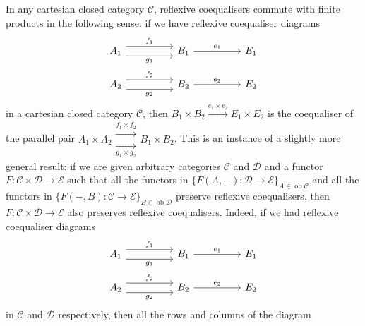 \documentclass[a4paper,11pt]{article}
\theoremstyle{break_italics}
\theoremstyle{break_upright}
\theoremstyle{remark}
\newcommand{\ob}{\operatorname{ob}}
\newcommand{\C}{\mathcal{C}}
\newcommand{\D}{\mathcal{D}}
\begin{document}
In any cartesian closed category $\C$, reflexive coequalisers commute with finite products in the following sense: if we have reflexive coequaliser diagrams
\[
\begin{tikzcd}
A_1 \arrow[rr, "f_1", shift left=2] \arrow[rr, "g_1"', shift right=2] &  & B_1 \arrow[rr, "e_1"] &  & E_1 \\
A_2 \arrow[rr, "f_2", shift left=2] \arrow[rr, "g_2"', shift right=2] &  & B_2 \arrow[rr, "e_2"] &  & E_2
\end{tikzcd}
\]
in a cartesian closed category $\C$, then $B_1 \times B_2 \xrightarrow{e_1 \times e_2} E_1 \times E_2$ is the coequaliser of the parallel pair $A_1 \times A_2 \substack{\xrightarrow{f_1 \times f_2} \\ \xrightarrow[g_1 \times g_2]{}} B_1 \times B_2$. This is an instance of a slightly more general result: if we are given arbitrary categories $\C$ and $\D$ and a functor $F \colon \C \times \D \to \mathcal E$ such that all the functors in $\{F(A, -) \colon \D \to \mathcal E\}_{A \in \ob\C}$ and all the functors in $\{F(-, B) \colon \C \to \mathcal E\}_{B \in \ob\D}$ preserve reflexive coequalisers, then $F \colon \mathcal C \times \mathcal D \to \mathcal E$ also preserves reflexive coequalisers. Indeed, if we had reflexive coequaliser diagrams
\[
\begin{tikzcd}
A_1 \arrow[rr, "f_1", shift left=2] \arrow[rr, "g_1"', shift right=2] &  & B_1 \arrow[rr, "e_1"] &  & E_1 \\
A_2 \arrow[rr, "f_2", shift left=2] \arrow[rr, "g_2"', shift right=2] &  & B_2 \arrow[rr, "e_2"] &  & E_2
\end{tikzcd}
\]
in $\C$ and $\D$ respectively, then all the rows and columns of the diagram
\end{document}
